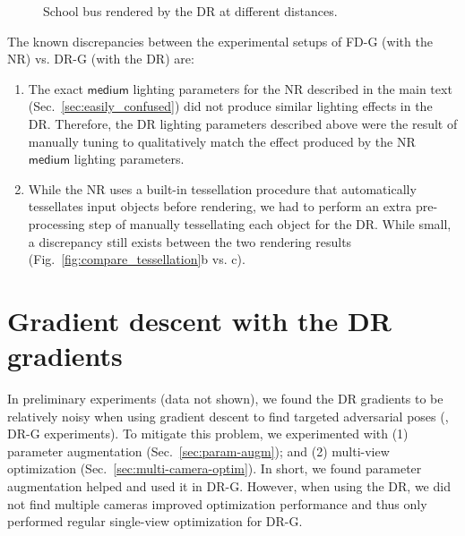 \documentclass[10pt,twocolumn,letterpaper]{article}
\newcommand{\medium}{\ensuremath{\mathsf{medium}}\xspace}
\begin{document}
\begin{figure}[ht]
  \centering
  \caption{School bus rendered by the DR at different distances.}\label{fig:dr-demo}
\end{figure}


The known discrepancies between the experimental setups of FD-G (with the NR) vs. DR-G (with the DR) are:

\begin{enumerate}
	\item The exact \medium lighting parameters for the NR described in the main text (Sec.~\ref{sec:easily_confused}) did not produce similar lighting effects in the DR.
	Therefore, the DR lighting parameters described above were the result of manually tuning to qualitatively match the effect produced by the NR \medium lighting parameters.
	\item While the NR uses a built-in tessellation procedure that automatically tessellates input objects before rendering, we had to perform an extra pre-processing step of manually tessellating each object for the DR.
	While small, a discrepancy still exists between the two rendering results (Fig.~\ref{fig:compare_tessellation}b vs. c).
\end{enumerate}





\section{Gradient descent with the DR gradients}\label{sec:kr}

In preliminary experiments (data not shown), we found the DR gradients to be relatively noisy when using gradient descent to find targeted adversarial poses (\ie, DR-G experiments).
To mitigate this problem, we experimented with (1) parameter augmentation (Sec.~\ref{sec:param-augm}); and (2) multi-view optimization (Sec.~\ref{sec:multi-camera-optim}).
In short, we found parameter augmentation helped and used it in DR-G.
However, when using the DR, we did not find multiple cameras improved optimization performance and thus only performed regular single-view optimization for DR-G.
\end{document}
